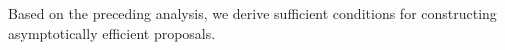 \documentclass[aap,preprint]{imsart}
\theoremstyle{plain}
\newtheorem{lemma}[theorem]{Lemma}
\theoremstyle{definition}
\begin{document}

Based on the preceding analysis, we derive sufficient conditions for constructing asymptotically efficient proposals.
\end{document}
